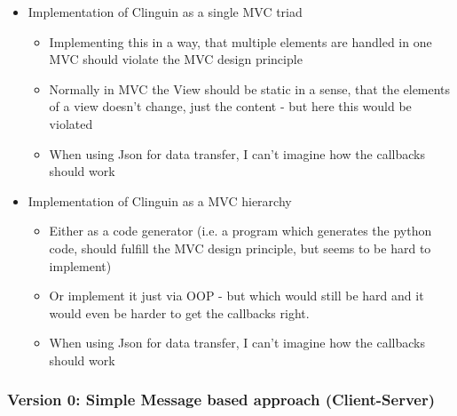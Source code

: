 \documentclass[12pt,a4paper]{article}
\newcommand{\<}[1]{\guilsinglleft}
\renewcommand{\>}[1]{\guilsinglright}
\begin{document}
\begin{itemize}
    \item Implementation of Clinguin as a single MVC triad
    \begin{itemize}
        \item Implementing this in a way, that multiple elements are handled in one MVC should violate the MVC design principle
        \item Normally in MVC the View should be static in a sense, that the elements of a view doesn't change, just the content - but here this would be violated
        \item When using Json for data transfer, I can't imagine how the callbacks should work
    \end{itemize}
    \item Implementation of Clinguin as a MVC hierarchy
    \begin{itemize}
        \item Either as a code generator (i.e. a program which generates the python code, should fulfill the MVC design principle, but seems to be hard to implement)
        \item Or implement it just via OOP - but which would still be hard and it would even be harder to get the callbacks right.
        \item When using Json for data transfer, I can't imagine how the callbacks should work
    \end{itemize}
\end{itemize}


\subsubsection{Version 0: Simple Message based approach (Client-Server)}
\label{subsubsec:client-server}
\end{document}
